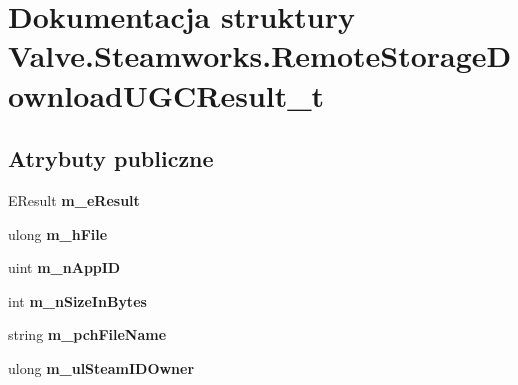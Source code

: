 \hypertarget{struct_valve_1_1_steamworks_1_1_remote_storage_download_u_g_c_result__t}{}\section{Dokumentacja struktury Valve.\+Steamworks.\+Remote\+Storage\+Download\+U\+G\+C\+Result\+\_\+t}
\label{struct_valve_1_1_steamworks_1_1_remote_storage_download_u_g_c_result__t}
\subsection*{Atrybuty publiczne}
\begin{DoxyCompactItemize}
\item 
\mbox{\label{struct_valve_1_1_steamworks_1_1_remote_storage_download_u_g_c_result__t_a38ed605db3a73064dd19ae0dd752faa9}} 
E\+Result {\bfseries m\+\_\+e\+Result}
\item 
\mbox{\label{struct_valve_1_1_steamworks_1_1_remote_storage_download_u_g_c_result__t_ac745cbaa1220db9d001a12c6c633abe6}} 
ulong {\bfseries m\+\_\+h\+File}
\item 
\mbox{\label{struct_valve_1_1_steamworks_1_1_remote_storage_download_u_g_c_result__t_a81951e0e8e809493fc8b6ae5d4d94437}} 
uint {\bfseries m\+\_\+n\+App\+ID}
\item 
\mbox{\label{struct_valve_1_1_steamworks_1_1_remote_storage_download_u_g_c_result__t_acb943bd1884a1917fa01ac21d59038c1}} 
int {\bfseries m\+\_\+n\+Size\+In\+Bytes}
\item 
\mbox{\label{struct_valve_1_1_steamworks_1_1_remote_storage_download_u_g_c_result__t_a7a8c7b19fc5602f2b2eccbd4890dde01}} 
string {\bfseries m\+\_\+pch\+File\+Name}
\item 
\mbox{\label{struct_valve_1_1_steamworks_1_1_remote_storage_download_u_g_c_result__t_a262615eb832c0ca4738bc6819e139aa7}} 
ulong {\bfseries m\+\_\+ul\+Steam\+I\+D\+Owner}
\end{DoxyCompactItemize}


